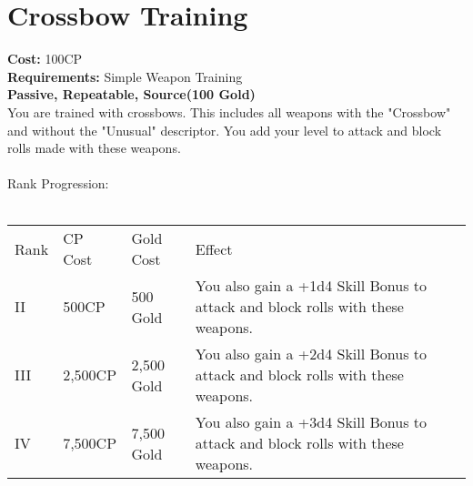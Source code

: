 \section{Crossbow Training}\label{perk:crossbowTraining}
\textbf{Cost:} 100CP\\
\textbf{Requirements:} Simple Weapon Training\\
\textbf{Passive, Repeatable, Source(100 Gold)}\\
You are trained with crossbows.
This includes all weapons with the "Crossbow" and without the "Unusual" descriptor.
You add your level to attack and block rolls made with these weapons.\\
\\
Rank Progression:\\
\\
\begin{tabular}{l | l | l | l}
	Rank & CP Cost & Gold Cost & Effect\\
	II & 500CP & 500 Gold & You also gain a +1d4 Skill Bonus to attack and block rolls with these weapons.\\
	III & 2,500CP & 2,500 Gold & You also gain a +2d4 Skill Bonus to attack and block rolls with these weapons.\\
	IV & 7,500CP & 7,500 Gold & You also gain a +3d4 Skill Bonus to attack and block rolls with these weapons.\\
\end{tabular}